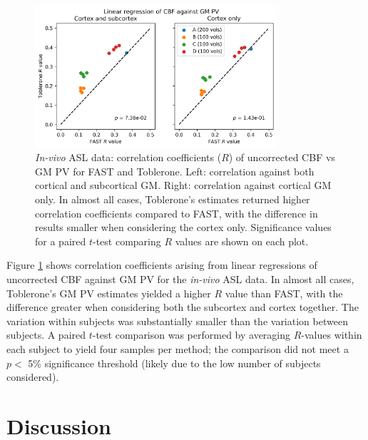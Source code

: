 \documentclass[12pt]{report}
\begin{document}
\begin{figure}[H]
\centering
\includegraphics[width = 0.8\textwidth]{tob_vs_fast_cbf_correlation.png}
\caption{\textit{In-vivo} ASL data: correlation coefficients ($R$) of uncorrected CBF vs GM PV for FAST and Toblerone. Left: correlation against both cortical and subcortical GM. Right: correlation against cortical GM only. In almost all cases, Toblerone's estimates returned higher correlation coefficients compared to FAST, with the difference in results smaller when considering the cortex only. Significance values for a paired $t$-test comparing $R$ values are shown on each plot. }
\label{tob_vs_fast_cbf_correlation}
\end{figure}

Figure \ref{tob_vs_fast_cbf_correlation} shows correlation coefficients arising from linear regressions of uncorrected CBF against GM PV for the \textit{in-vivo} ASL data. In almost all cases, Toblerone's GM PV estimates yielded a higher $R$ value than FAST, with the difference greater when considering both the subcortex and cortex together. The variation within subjects was substantially smaller than the variation between subjects. A paired $t$-test comparison was performed by averaging $R$-values within each subject to yield four samples per method; the comparison did not meet a $p <$ 5\% significance threshold (likely due to the low number of subjects considered). 

\section{Discussion}
\end{document}
